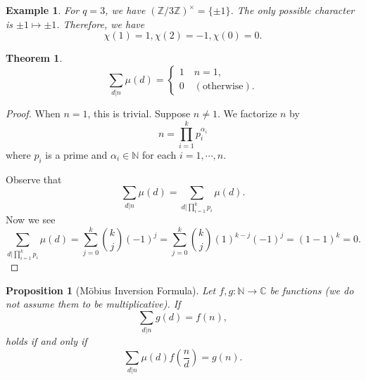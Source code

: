 \documentclass{article}
\newtheorem{theorem}{Theorem} [section]
\newtheorem{proposition}{Proposition}[section]
\newtheorem{example}{Example}[section]
\newcommand{\N}[0]{\mathbb{N}}
\newcommand{\Z}[0]{\mathbb{Z}}
\newcommand{\C}[0]{\mathbb{C}}
\begin{document}
\begin{example}
  For $q=3$, we have $(\Z/3\Z)^\times = \{\pm 1\}$. The only possible character is $\pm1\mapsto \pm1$. Therefore, we have
  \begin{equation*}
    \chi(1) = 1,\chi(2) = -1,\chi(0)=0.
  \end{equation*}
\end{example}

\begin{theorem}
\begin{equation*}
  \sum_{d|n}\mu(d) = \begin{cases}
    1\quad n = 1,\\
    0\quad(\text{otherwise}).
  \end{cases}
\end{equation*}
\label{mobius_identity}
\end{theorem}

\begin{proof}
  When $n=1$, this is trivial. Suppose $n\not=1$. We factorize $n$ by 
  \begin{equation*}
    n = \prod_{i=1}^k p_i^{\alpha_i}
  \end{equation*}
  where $p_i$ is a prime and $\alpha_i\in\N$ for each $i=1,\cdots,n$.
  \par Observe that 
  \begin{equation*}
    \sum_{d|n}\mu(d) = \sum_{d|\prod_{i=1}^k p_i}\mu(d).
  \end{equation*}
  Now we see 
  \begin{equation*}
    \sum_{d|\prod_{i=1}^k p_i}\mu(d) = \sum_{j=0}^k{k \choose j}(-1)^j = \sum_{j=0}^k{k \choose j}(1)^{k-j}(-1)^j = (1-1)^k = 0.
  \end{equation*}
\end{proof}

\begin{proposition}[Möbius Inversion Formula]
  \label{proposition_inversion_formula}
  Let $f,g:\N\to\C$ be functions (we do not assume them to be multiplicative). If 
  \begin{equation*}
    \sum_{d|n}g(d) = f(n),
  \end{equation*}
  holds if and only if 
  \begin{equation*}
    \sum_{d|n}\mu(d)f\left({\frac n d}\right) = g(n).
  \end{equation*}
\end{proposition}
\end{document}
